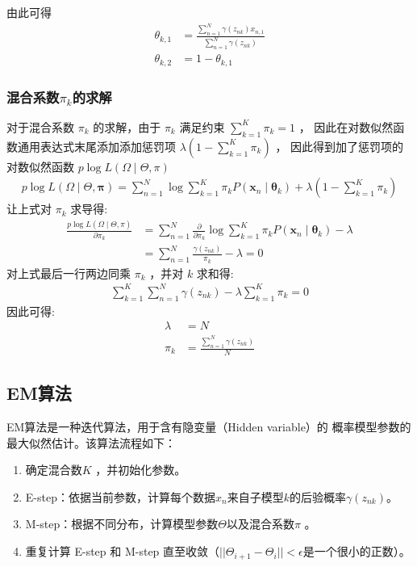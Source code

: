 \documentclass[UTF8]{ctexart}
\begin{document}
由此可得
$$
\begin{aligned}
\theta_{k, 1} &=\frac{\sum_{n=1}^{N} \gamma\left(z_{n k}\right) x_{n, 1}}{\sum_{n=1}^{N} \gamma\left(z_{n k}\right)} \\
\theta_{k, 2} &=1-\theta_{k, 1}
\end{aligned}
$$

\subsubsection{混合系数$\pi_k$的求解}

对于混合系数 $\pi_{k}$ 的求解，由于 $\pi_{k}$ 满足约束 $\sum_{k=1}^{K} \pi_{k}=1$ ， 
因此在对数似然函数通用表达式末尾添加添加惩罚项 $\lambda\left(1-\sum_{k=1}^{K} \pi_{k}\right)$ ，
因此得到加了惩罚项的对数似然函数 $p \log L(\Omega \mid \Theta, \pi)$
$$
\begin{aligned}
p \log L(\Omega \mid \Theta, \boldsymbol{\pi})=\sum_{n=1}^{N} \log \sum_{k=1}^{K} \pi_{k} P\left(\boldsymbol{x}_{n} \mid \boldsymbol{\theta}_{k}\right)+\lambda\left(1-\sum_{k=1}^{K} \pi_{k}\right)
\end{aligned}
$$
让上式对 $\pi_{k}$ 求导得:
$$
\begin{aligned}
\frac{p \log L(\Omega \mid \Theta, \pi)}{\partial \pi_{k}} 
&=\sum_{n=1}^{N} \frac{\partial}{\partial \pi_{k}} \log \sum_{k=1}^{K} \pi_{k} P\left(\boldsymbol{x}_{n} \mid \boldsymbol{\theta}_{k}\right)-\lambda \\
&=\sum_{n=1}^{N} \frac{\gamma\left(z_{n k}\right)}{\pi_{k}}-\lambda=0
\end{aligned}
$$
对上式最后一行两边同乘 $\pi_{k}$ ，并对 $k$ 求和得:
$$
\begin{aligned}
\sum_{k=1}^{K} \sum_{n=1}^{N} \gamma\left(z_{n k}\right)-\lambda \sum_{k=1}^{K} \pi_{k}=0
\end{aligned}
$$
因此可得:
$$
\begin{aligned}
\lambda&=N\\
\pi_{k}&=\frac{\sum_{n=1}^{N} \gamma\left(z_{n k}\right)}{N}
\end{aligned}
$$

\subsection{EM算法}
EM算法是一种迭代算法，用于含有隐变量（Hidden variable）的
概率模型参数的最大似然估计。该算法流程如下：
\begin{enumerate}
    \item 确定混合数$K$ ，并初始化参数。
    \item E-step：依据当前参数，计算每个数据$x_n$来自子模型$k$的后验概率$\gamma(z_{n k})$。
    \item M-step：根据不同分布，计算模型参数$\Theta$以及混合系数$\pi$ 。
    \item 重复计算 E-step 和 M-step 直至收敛（$||\Theta_{i+1}-\Theta_{i}|| < \epsilon$是一个很小的正数）。
\end{enumerate}
\end{document}
